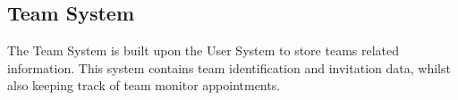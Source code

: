 \documentclass[12pt]{report}
\newcommand{\n}{\par}
\newcommand{\br}{\n\vspace{1 em}\n}
\begin{document}
\subsection{Team System} \label{data-layer.design.team-system}
The Team System is built upon the User System to store teams related information.
This system contains team identification and invitation data,
whilst also keeping track of team monitor appointments.






\end{document}
